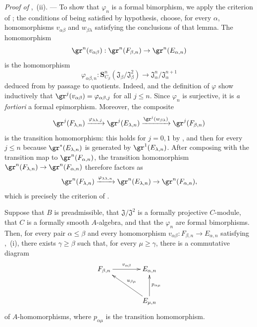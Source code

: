 \begin{env}[19.5.6.6]
\label{0.19.5.6.6}
\emph{Proof of} ,~(ii). ---
To show that $\varphi_n$ is a formal bimorphism, we apply the criterion of ; the conditions of  being satisfied by hypothesis, choose, for every $\alpha$, homomorphisms $v_{\alpha\beta}$ and $w_{\beta\lambda}$ satisfying the conclusions of that lemma.
The homomorphism
\[
  \gr^n(v_{\alpha\beta}):\gr^n(F_{\beta,n})\to\gr^n(E_{\alpha,n})
\]
is the homomorphism
\[
  \varphi_{\alpha\beta,n}:\mathbf{S}_{C_\beta}^n(\mathfrak{J}_\beta/\mathfrak{J}_\beta^2)\to\mathfrak{J}_\alpha^n/\mathfrak{J}_\alpha^{n+1}
\]
deduced from  by passage to quotients.
Indeed,  and the definition of $\varphi$ show inductively that $\gr^j(v_{\alpha\beta})=\varphi_{\alpha\beta,j}$ for all $j\leq n$.
Since $\varphi_n$ is surjective, it is \emph{a fortiori} a formal epimorphism.
Moreover, the composite
\[
  \gr^j(F_{\lambda,n})\xrightarrow{\varphi_{\lambda\lambda,j}}\gr^j(E_{\lambda,n})\xrightarrow{\gr^j(w_{\beta\lambda})}\gr^j(F_{\beta,n})
\]
is the transition homomorphism: this holds for $j=0,1$ by , and then for every $j\leq n$ because $\gr^*(E_{\lambda,n})$ is generated by $\gr^1(E_{\lambda,n})$.
After composing with the transition map to $\gr^n(F_{\alpha,n})$, the transition homomorphism $\gr^n(F_{\lambda,n})\to\gr^n(F_{\alpha,n})$ therefore factors as
\[
  \gr^n(F_{\lambda,n})\xrightarrow{\varphi_{\lambda\lambda,n}}\gr^n(E_{\lambda,n})\to\gr^n(F_{\alpha,n}),
\]
which is precisely the criterion of .
\end{env}

\begin{lemma}[19.5.6.7]
\label{0.19.5.6.7}
Suppose that $B$ is preadmissible, that $\mathfrak{J}/\mathfrak{J}^2$ is a formally projective $C$-module, that $C$ is a formally smooth $A$-algebra, and that the $\varphi_n$ are formal bimorphisms.
Then, for every pair $\alpha\leq\beta$ and every homomorphism $v_{\alpha\beta}:F_{\beta,n}\to E_{\alpha,n}$ satisfying ,~{\rm(i)}, there exists $\gamma\geq\beta$ such that, for every $\mu\geq\gamma$, there is a commutative diagram
\[
\xymatrix@C=4em@R=3em{
  F_{\beta,n} \ar[r]^{v_{\alpha\beta}} & E_{\alpha,n} \\
  & E_{\mu,n} \ar[ul]_{u_{\beta\mu}} \ar[u]_{p_{\alpha\mu}}
}
\]
of $A$-homomorphisms, where $p_{\alpha\mu}$ is the transition homomorphism.
\end{lemma}

